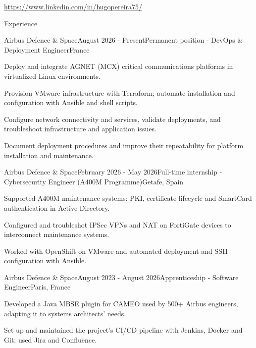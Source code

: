 \documentclass[
    10pt,
]{style} %
\begin{document}
    \begin{center}
        \url{https://www.linkedin.com/in/hugopereira75/}
    \end{center}


    \begin{rSection}{Experience}

        \begin{rSubsection}{Airbus Defence \& Space}{August 2026 - Present}{Permanent position - DevOps \& Deployment Engineer}{France}
            \item Deploy and integrate AGNET (MCX) critical communications platforms in virtualized Linux environments.
            \item Provision VMware infrastructure with Terraform; automate installation and configuration with Ansible and shell scripts.
            \item Configure network connectivity and services, validate deployments, and troubleshoot infrastructure and application issues.
            \item Document deployment procedures and improve their repeatability for platform installation and maintenance.
        \end{rSubsection}

        \begin{rSubsection}{Airbus Defence \& Space}{February 2026 - May 2026}{Full-time internship - Cybersecurity Engineer (A400M Programme)}{Getafe, Spain}
            \item Supported A400M maintenance systems: PKI, certificate lifecycle and SmartCard authentication in Active Directory.
            \item Configured and troubleshot IPSec VPNs and NAT on FortiGate devices to interconnect maintenance systems.
            \item Worked with OpenShift on VMware and automated deployment and SSH configuration with Ansible.
        \end{rSubsection}

        \begin{rSubsection}{Airbus Defence \& Space}{August 2023 - August 2026}{Apprenticeship - Software Engineer}{Paris, France}
            \item Developed a Java MBSE plugin for CAMEO used by 500+ Airbus engineers, adapting it to systems architects' needs.
            \item Set up and maintained the project's CI/CD pipeline with Jenkins, Docker and Git; used Jira and Confluence.
        \end{rSubsection}


\end{rSection}
\end{document}
